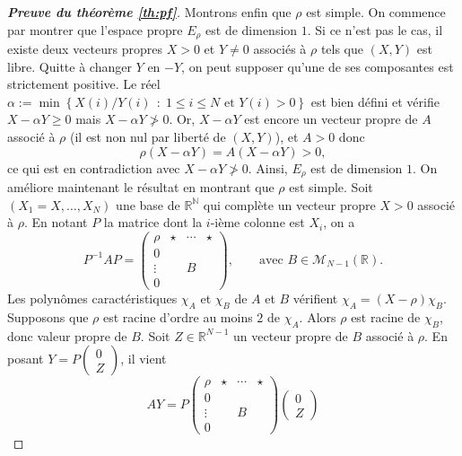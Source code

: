 \documentclass[11pt]{article}
\newcommand{\ens}[3][\middle|]{
    \left\{#2 \;\, #1 \; #3\right\}
}
\newcommand{\R}{\mathbb{R}}
\newcommand{\N}{\mathbb{N}}
\renewcommand{\leq}{\leqslant}
\renewcommand{\geq}{\geqslant}
\theoremstyle{plain}
\begin{document}
\begin{proof}[\emph{\textbf{Preuve du théorème \ref{th:pf}}}]
    Montrons enfin que $\rho$ est simple. On commence par montrer que l'espace propre $E_{\rho}$ est de dimension $1$. Si ce n'est pas le cas, il existe deux vecteurs propres $X > 0$ et $Y \neq 0$ associés à $\rho$ tels que $(X,Y)$ est libre. Quitte à changer $Y$ en $-Y$, on peut supposer qu'une de ses composantes est strictement positive. Le réel $\alpha := \min\ens[:]{X(i)/Y(i)}{1 \leq i \leq N \text{ et } Y(i) > 0}$ est bien défini et vérifie $X - \alpha Y \geq 0$ mais $X - \alpha Y \ngtr 0$. Or, $X - \alpha Y$ est encore un vecteur propre de $A$ associé à $\rho$ (il est non nul par liberté de $(X, Y)$), et $A > 0$ donc
    $$\rho (X - \alpha Y) = A(X - \alpha Y) > 0,$$
    ce qui est en contradiction avec $X - \alpha Y \ngtr 0$. Ainsi, $E_{\rho}$ est de dimension $1$. On améliore maintenant le résultat en montrant que $\rho$ est simple. Soit $(X_1 = X, \ldots, X_N)$ une base de $\R^{\N}$ qui complète un vecteur propre $X > 0$ associé à $\rho$. En notant $P$ la matrice dont la $i$-ième colonne est $X_i$, on a 
    $$P^{-1}AP = 
    \left(
    \begin{array}{c|ccc}
        \rho   & \star & \cdots & \star\\
         \hline
        0      &       &        &\\
        \vdots &       & B      &\\
        0      &       &        &
    \end{array}
    \right), \qquad \text{avec } B \in \mathcal{M}_{N - 1}(\R).$$
    Les polynômes caractéristiques $\chi_A$ et $\chi_B$ de $A$ et $B$ vérifient $\chi_A = (X - \rho) \chi_B$. Supposons que $\rho$ est racine d'ordre au moins $2$ de $\chi_A$. Alors $\rho$ est racine de $\chi_B$, donc valeur propre de $B$. Soit $Z \in \R^{N-1}$ un vecteur propre de $B$ associé à $\rho$. En posant $Y = P\begin{pmatrix} 0\\ Z \end{pmatrix}$, il vient
    $$AY = P 
    \left(
    \begin{array}{c|ccc}
        \rho   & \star & \cdots & \star\\
            \hline
        0      &       &        &\\
        \vdots &       & B      &\\
        0      &       &        &
    \end{array}
    \right)
    \begin{pmatrix} 0\\ Z \end{pmatrix}
$$
\end{proof}
\end{document}
